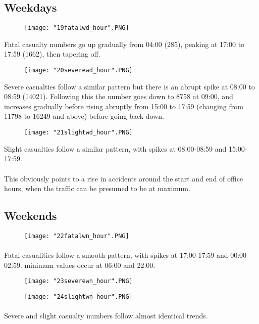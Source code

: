 \documentclass[a4paper, 12pt]{article}
\begin{document}
\subsection{Weekdays}
\begin{figure}[!h]
\texttt{[image: "19fatalwd\_hour".PNG]}
\end{figure}
Fatal casualty numbers go up gradually from 04:00 (285), peaking at 17:00 to 17:59 (1662), then tapering off.
\begin{figure}[!h]
\texttt{[image: "20severewd\_hour".PNG]}
\end{figure}
Severe casualties follow a similar pattern but there is an abrupt spike at 08:00 to 08:59 (14021). Following this the number goes down to 8758 at 09:00, and increases gradually before rising abruptly from 15:00 to 17:59 (changing from 11798 to 16249 and above) before going back down.
\begin{figure}[!h]
\texttt{[image: "21slightwd\_hour".PNG]}
\end{figure}
Slight casualties follow a similar pattern, with spikes at 08:00-08:59 and 15:00-17:59.
\paragraph{} This obviously points to a rise in accidents around the start and end of office hours, when the traffic can be presumed to be at maximum.
\subsection{Weekends}
\begin{figure}[!h]
\texttt{[image: "22fatalwn\_hour".PNG]}
\end{figure}
\paragraph{}
Fatal casualities follow a smooth pattern, with spikes at 17:00-17:59 and 00:00-02:59. minimum values occur at 06:00 and 22:00.
\begin{figure}[!h]
\texttt{[image: "23severewn\_hour".PNG]}
\end{figure}
\begin{figure}[!h]
\texttt{[image: "24slightwn\_hour".PNG]}
\end{figure}
\paragraph{}
Severe and slight casualty numbers follow almost identical trends.
\end{document}
